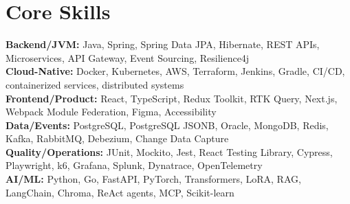 \documentclass[10pt,a4paper]{article}
\newcommand{\skill}[2]{%
  \textbf{#1:} #2\\
}
\begin{document}
\section*{Core Skills}
\skill{Backend/JVM}{Java, Spring, Spring Data JPA, Hibernate, REST APIs, Microservices, API Gateway, Event Sourcing, Resilience4j}
\skill{Cloud-Native}{Docker, Kubernetes, AWS, Terraform, Jenkins, Gradle, CI/CD, containerized services, distributed systems}
\skill{Frontend/Product}{React, TypeScript, Redux Toolkit, RTK Query, Next.js, Webpack Module Federation, Figma, Accessibility}
\skill{Data/Events}{PostgreSQL, PostgreSQL JSONB, Oracle, MongoDB, Redis, Kafka, RabbitMQ, Debezium, Change Data Capture}
\skill{Quality/Operations}{JUnit, Mockito, Jest, React Testing Library, Cypress, Playwright, k6, Grafana, Splunk, Dynatrace, OpenTelemetry}
\skill{AI/ML}{Python, Go, FastAPI, PyTorch, Transformers, LoRA, RAG, LangChain, Chroma, ReAct agents, MCP, Scikit-learn}
\end{document}

